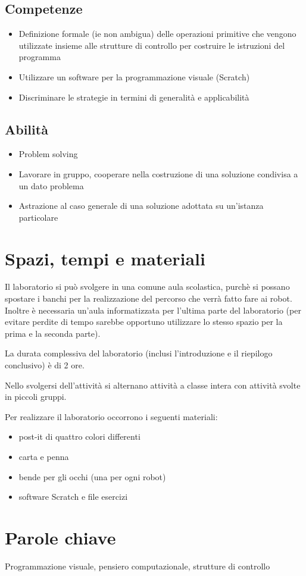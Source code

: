 \documentclass[12pt]{article}
\begin{document}
\subsection{Competenze}
\begin{itemize}
\item Definizione formale (ie non ambigua) delle operazioni primitive che vengono utilizzate insieme alle strutture di controllo per costruire le istruzioni del programma
\item Utilizzare un software per la programmazione visuale (Scratch)
\item Discriminare le strategie in termini di generalità e applicabilità
\end{itemize}

\subsection{Abilità}
\begin{itemize}
\item Problem solving
\item Lavorare in gruppo, cooperare nella costruzione di una soluzione condivisa a un dato problema
\item Astrazione al caso generale di una soluzione adottata su un’istanza particolare
\end{itemize}
%
%
\section{Spazi, tempi e materiali}
Il laboratorio si può svolgere in una comune aula scolastica, purchè si possano spostare i banchi per la realizzazione del percorso che verrà fatto fare ai robot. Inoltre è necessaria un'aula informatizzata per l'ultima parte del laboratorio (per evitare perdite di tempo sarebbe opportuno utilizzare lo stesso spazio per la prima e la seconda parte).

La durata complessiva del laboratorio (inclusi l'introduzione e il riepilogo conclusivo) è di 2 ore.

Nello svolgersi dell'attività si alternano attività a classe intera con attività svolte in piccoli gruppi.

Per realizzare il laboratorio occorrono i seguenti materiali:
\begin{itemize}
\item post-it di quattro colori differenti
\item carta e penna
\item bende per gli occhi (una per ogni robot)
\item software Scratch e file esercizi
\end{itemize}
%
%
\section{Parole chiave}
Programmazione visuale, pensiero computazionale, strutture di controllo
%
% 
\end{document}
